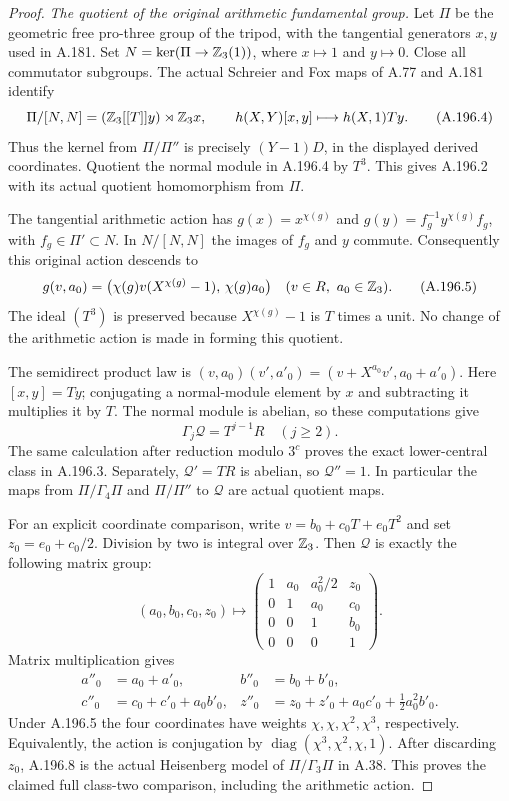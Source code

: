 \begin{proof}
\emph{The quotient of the original arithmetic fundamental group.}
Let \(\Pi\) be the geometric free pro-three group of the
tripod, with the tangential generators \(x,y\) used in A.181.
Set \(N=\ker(\Pi\to\mathbb Z_3(1))\), where \(x\mapsto1\) and
\(y\mapsto0\).  Close all commutator subgroups.  The actual
Schreier and Fox maps of A.77 and A.181 identify
\[
 \Pi/[N,N]=(\mathbb Z_3[[T]]y)\rtimes\mathbb Z_3x,
 \qquad
 h(X,Y)[x,y]\longmapsto h(X,1)Ty.
\tag{A.196.4}
\]
Thus the kernel from \(\Pi/\Pi''\) is precisely
\((Y-1)D\), in the displayed derived coordinates.  Quotient
the normal module in A.196.4 by \(T^3\).  This gives A.196.2
with its actual quotient homomorphism from \(\Pi\).

The tangential arithmetic action has
\(g(x)=x^{\chi(g)}\) and
\(g(y)=f_g^{-1}y^{\chi(g)}f_g\), with
\(f_g\in\Pi'\subset N\).  In \(N/[N,N]\) the images of
\(f_g\) and \(y\) commute.  Consequently this original action
descends to
\[
 g(v,a_0)=
 \bigl(\chi(g)v(X^{\chi(g)}-1),\,\chi(g)a_0\bigr)
 \quad(v\in R,\ a_0\in\mathbb Z_3).
\tag{A.196.5}
\]
The ideal \((T^3)\) is preserved because
\(X^{\chi(g)}-1\) is \(T\) times a unit.  No change of the
arithmetic action is made in forming this quotient.

The semidirect product law is
\((v,a_0)(v',a'_0)=(v+X^{a_0}v',a_0+a'_0)\).
Here \([x,y]=Ty\); conjugating a normal-module element by
\(x\) and subtracting it multiplies it by \(T\).  The normal
module is abelian, so these computations give
\[
 \Gamma_j\mathcal Q=T^{j-1}R\quad(j\ge2).
\tag{A.196.6}
\]
The same calculation after reduction modulo \(3^c\) proves
the exact lower-central class in A.196.3.  Separately,
\(\mathcal Q'=TR\) is abelian, so \(\mathcal Q''=1\).
In particular the maps from \(\Pi/\Gamma_4\Pi\) and
\(\Pi/\Pi''\) to \(\mathcal Q\) are actual quotient maps.

For an explicit coordinate comparison, write
\(v=b_0+c_0T+e_0T^2\) and set \(z_0=e_0+c_0/2\).
Division by two is integral over \(\mathbb Z_3\).  Then
\(\mathcal Q\) is exactly the following matrix group:
\[
 (a_0,b_0,c_0,z_0)\longmapsto
 \begin{pmatrix}
 1&a_0&a_0^2/2&z_0\\
 0&1&a_0&c_0\\
 0&0&1&b_0\\
 0&0&0&1
 \end{pmatrix}.
\tag{A.196.7}
\]
Matrix multiplication gives
\[
\begin{aligned}
 a''_0&=a_0+a'_0,& b''_0&=b_0+b'_0,\\
 c''_0&=c_0+c'_0+a_0b'_0,&
 z''_0&=z_0+z'_0+a_0c'_0+\tfrac12a_0^2b'_0.
\end{aligned}
\tag{A.196.8}
\]
Under A.196.5 the four coordinates have weights
\(\chi,\chi,\chi^2,\chi^3\), respectively.  Equivalently,
the action is conjugation by
\(\operatorname{diag}(\chi^3,\chi^2,\chi,1)\).
After discarding \(z_0\), A.196.8 is the actual Heisenberg
model of \(\Pi/\Gamma_3\Pi\) in A.38.  This proves the
claimed full class-two comparison, including the arithmetic
action.


\end{proof}
